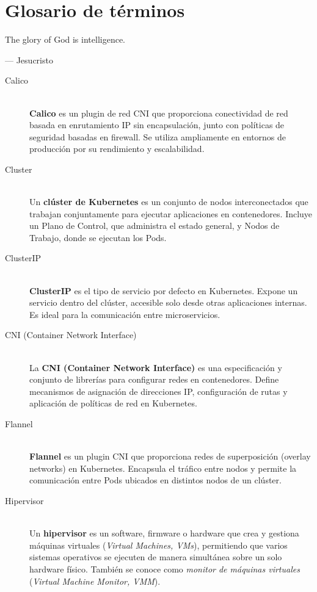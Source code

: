 {\justifying
	\chapter{Glosario de términos}
	\epigraph{The glory of God is intelligence.}{--- \textup{Jesucristo}}
    
\begin{description}

    \item[Calico] \hfill \\ 
    \textbf{Calico} es un plugin de red CNI que proporciona conectividad de red basada en enrutamiento IP sin encapsulaci\'{o}n, junto con pol\'{i}ticas de seguridad basadas en firewall. Se utiliza ampliamente en entornos de producci\'{o}n por su rendimiento y escalabilidad.
    
    \item[Cluster] \hfill \\ 
    Un \textbf{cl\'{u}ster de Kubernetes} es un conjunto de nodos interconectados que trabajan conjuntamente para ejecutar aplicaciones en contenedores. Incluye un Plano de Control, que administra el estado general, y Nodos de Trabajo, donde se ejecutan los Pods.
    
    \item[ClusterIP] \hfill \\ 
    \textbf{ClusterIP} es el tipo de servicio por defecto en Kubernetes. Expone un servicio dentro del cl\'{u}ster, accesible solo desde otras aplicaciones internas. Es ideal para la comunicaci\'{o}n entre microservicios.
    
    \item[CNI (Container Network Interface)] \hfill \\ 
    La \textbf{CNI (Container Network Interface)} es una especificaci\'{o}n y conjunto de librer\'{i}as para configurar redes en contenedores. Define mecanismos de asignaci\'{o}n de direcciones IP, configuraci\'{o}n de rutas y aplicaci\'{o}n de pol\'{i}ticas de red en Kubernetes.
    
    \item[Flannel] \hfill \\ 
    \textbf{Flannel} es un plugin CNI que proporciona redes de superposici\'{o}n (overlay networks) en Kubernetes. Encapsula el tr\'{a}fico entre nodos y permite la comunicaci\'{o}n entre Pods ubicados en distintos nodos de un cl\'{u}ster.
    
    \item[Hipervisor] \hfill \\ 
    Un \textbf{hipervisor} es un software, firmware o hardware que crea y gestiona máquinas virtuales (\textit{Virtual Machines, VMs}), permitiendo que varios sistemas operativos se ejecuten de manera simultánea sobre un solo hardware físico. También se conoce como \textit{monitor de máquinas virtuales} (\textit{Virtual Machine Monitor, VMM}).
    

\end{description}}
